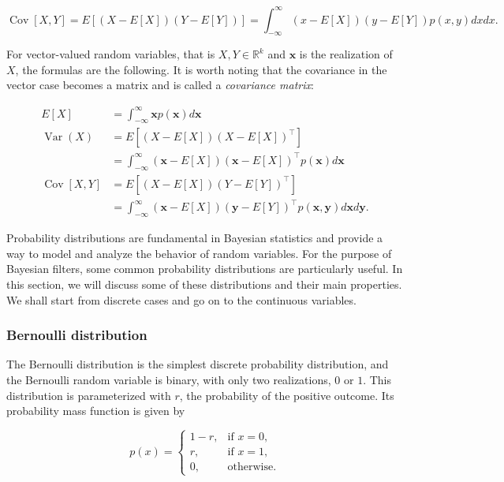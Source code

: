 $$
\operatorname{Cov}[X, Y]
    = E\left[(X-E[X])(Y-E[Y])\right]
    =\int_{-\infty}^{\infty}(x-E[X])(y-E[Y]) p(x, y) d x d x.
$$

For vector-valued random variables, that is $X, Y \in \mathbb{R}^k$ and $\mathbf{x}$
is the realization of $X$, the formulas are the following. It is worth noting that
the covariance in the vector case becomes a matrix and is called a \textit{covariance
matrix}:

$$
\begin{aligned}
E[X]
    &=\int_{-\infty}^{\infty} \mathbf{x} p(\mathbf{x}) d \mathbf{x} \\
\operatorname{Var}(X)
    &= E\left[\left(X-E[X]\right)\left(X-E[X]\right)^\intercal\right]
    \\&=\int_{-\infty}^{\infty}
        \left(\mathbf{x}-E[X]\right)
        \left(\mathbf{x}-E[X]\right)^\intercal
        p(\mathbf{x})
        d \mathbf{x} \\
\operatorname{Cov}[X, Y]
    &= E\left[\left(X-E[X]\right)\left(Y-E[Y]\right)^\intercal\right]
    \\&=\int_{-\infty}^{\infty}
        \left(\mathbf{x}-E[X]\right)
        \left(\mathbf{y}-E[Y]\right)^\intercal
        p(\mathbf{x}, \mathbf{y})
        d \mathbf{x} d \mathbf{y}.
\end{aligned}
$$

Probability distributions are fundamental in Bayesian statistics and
provide a way to model and analyze the behavior of random variables. For
the purpose of Bayesian filters, some common probability distributions
are particularly useful. In this section, we will discuss some of these
distributions and their main properties. We shall start from discrete
cases and go on to the continuous variables.  %

\subsubsection{Bernoulli distribution}

The Bernoulli distribution is the simplest discrete probability
distribution, and the Bernoulli random variable is binary, with only
two realizations, $0$ or $1$. This distribution is parameterized with 
$r$, the probability of the positive outcome. Its probability mass 
function is given by

$$
p(x) = \begin{cases}
 1 - r, & \text{if } x = 0, \\
     r, & \text{if } x = 1, \\
     0, & \text{otherwise}.
\end{cases}
$$


